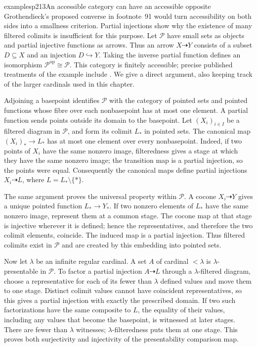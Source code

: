 
\begin{dcomment}{examples}{p213}{An accessible category can have an accessible opposite}
Grothendieck's proposed converse in footnote~91 would turn accessibility on both sides into a smallness criterion. Partial injections show why the existence of many filtered colimits is insufficient for this purpose. Let $\mathcal P$ have small sets as objects and partial injective functions as arrows. Thus an arrow $X\dashrightarrow Y$ consists of a subset $D\subseteq X$ and an injection $D\hookrightarrow Y$. Taking the inverse partial function defines an isomorphism $\mathcal P^{\mathrm{op}}\cong\mathcal P$. This category is finitely accessible; precise published treatments of the example include \citet[\S3.2, Proposition~3.6, Lemma~3.8, Theorem~3.9]{Heunen2013L2}. We give a direct argument, also keeping track of the larger cardinals used in this chapter.

Adjoining a basepoint identifies $\mathcal P$ with the category of pointed sets and pointed functions whose fibre over each nonbasepoint has at most one element. A partial function sends points outside its domain to the basepoint. Let $(X_i)_{i\in I}$ be a filtered diagram in $\mathcal P$, and form its colimit $L_*$ in pointed sets. The canonical map $(X_i)_*\to L_*$ has at most one element over every nonbasepoint. Indeed, if two points of $X_i$ have the same nonzero image, filteredness gives a stage at which they have the same nonzero image; the transition map is a partial injection, so the points were equal. Consequently the canonical maps define partial injections $X_i\dashrightarrow L$, where $L=L_*\setminus\{*\}$.

The same argument proves the universal property within $\mathcal P$. A cocone $X_i\dashrightarrow Y$ gives a unique pointed function $L_*\to Y_*$. If two nonzero elements of $L_*$ have the same nonzero image, represent them at a common stage. The cocone map at that stage is injective wherever it is defined; hence the representatives, and therefore the two colimit elements, coincide. The induced map is a partial injection. Thus filtered colimits exist in $\mathcal P$ and are created by this embedding into pointed sets.

Now let $\lambda$ be an infinite regular cardinal. A set $A$ of cardinal $<\lambda$ is $\lambda$-presentable in $\mathcal P$. To factor a partial injection $A\dashrightarrow L$ through a $\lambda$-filtered diagram, choose a representative for each of its fewer than $\lambda$ defined values and move them to one stage. Distinct colimit values cannot have coincident representatives, so this gives a partial injection with exactly the prescribed domain. If two such factorizations have the same composite to $L$, the equality of their values, including any values that become the basepoint, is witnessed at later stages. There are fewer than $\lambda$ witnesses; $\lambda$-filteredness puts them at one stage. This proves both surjectivity and injectivity of the presentability comparison map.


\end{dcomment}
